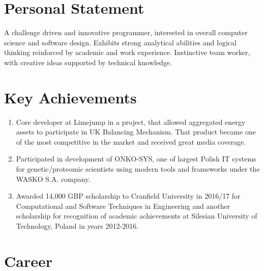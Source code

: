 \documentclass[12pt,english]{resume}
\begin{document}

	\begin{center}
		
		
	\end{center}
	
	\section{Personal Statement}
		A challenge driven and innovative programmer, interested in overall computer
		science and software design. Exhibits strong analytical abilities and logical
		thinking reinforced by academic and work experience. Instinctive team worker,
		with creative ideas supported by technical knowledge.

	\section{Key Achievements}
		\begin{enumerate}[i]
			\item Core developer at Limejump in a project, that allowed aggregated energy assets to participate in UK Balancing Mechanism. That product became one of the most competitive in the market and received great media coverage.
			\item Participated in development of ONKO-SYS, one of largest Polish IT systems for genetic/proteomic scientists using modern tools and frameworks under the WASKO S.A. company.
			\item Awarded 14,000 GBP scholarship to Cranfield University in 2016/17 for Computational and Software Techniques in Engineering and another scholarship for recognition of academic achievements at Silesian University of Technology, Poland in years 2012-2016.
		\end{enumerate}

	\section{Career}
\end{document}
